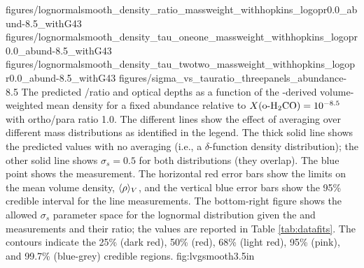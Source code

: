 %
%



\FigureFourPDF
    {figures/lognormalsmooth_density_ratio_massweight_withhopkins_logopr0.0_abund-8.5_withG43}
    {figures/lognormalsmooth_density_tau_oneone_massweight_withhopkins_logopr0.0_abund-8.5_withG43}
    {figures/lognormalsmooth_density_tau_twotwo_massweight_withhopkins_logopr0.0_abund-8.5_withG43}
    {figures/sigma_vs_tauratio_threepanels_abundance-8.5}
{The predicted \formaldehyde \oneone/\twotwo ratio and optical depths as a
function of the \thirteenco-derived volume-weighted mean density for a fixed
abundance relative to \hh $X(\textrm{o-H}_2\textrm{CO}) = 10^{-8.5}$  with \hh ortho/para ratio
1.0.  The different lines show the effect of averaging over different
mass distributions as identified in the legend. %
The thick solid line shows the predicted values
with no averaging (i.e., a $\delta$-function density distribution); the other solid line
shows $\sigma_s=0.5$ for both distributions (they overlap).
The blue point shows the \north measurement.  The horizontal red error bars
show the limits on the mean volume density, $\langle\rho\rangle_V$, and the vertical blue error
bars show the 95\% credible interval for the \formaldehyde line measurements.
The bottom-right figure shows the allowed $\sigma_s$ parameter space for the
lognormal distribution given the \oneone and \twotwo measurements and their
ratio; the values are reported in Table \ref{tab:datafits}.  The contours
indicate the 25\% (dark red), 50\% (red), 68\% (light red), 95\% (pink), and 99.7\%
(blue-grey) credible regions.
}
{fig:lvgsmooth}{3.5in}

